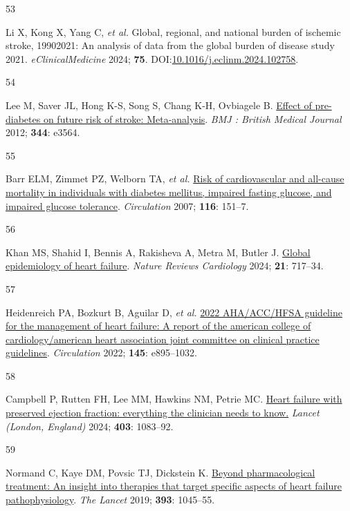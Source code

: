 \documentclass[
  a4paper,
  headsepline=true,
  open=left]{scrbook}
\newlength{\cslhangindent}
\newlength{\csllabelwidth}
\newlength{\cslentryspacingunit} %
\newenvironment{CSLReferences}[2] %
 {%
  \setlength{\parindent}{0pt}
  \ifodd #1
  \let\oldpar\par
  \def\par{\hangindent=\cslhangindent\oldpar}
  \fi
  \setlength{\parskip}{#2\cslentryspacingunit}
 }%
 {}
\newcommand{\CSLLeftMargin}[1]{\parbox[t]{\csllabelwidth}{#1}}
\newcommand{\CSLRightInline}[1]{\parbox[t]{\linewidth - \csllabelwidth}{#1}\break}
\begin{document}
\begin{CSLReferences}{0}{0}
\leavevmode{}%
\CSLLeftMargin{53 }%
\CSLRightInline{Li X, Kong X, Yang C, \emph{et al.} Global, regional,
and national burden of ischemic stroke, 1990{\textendash}2021: An
analysis of data from the global burden of disease study 2021.
\emph{eClinicalMedicine} 2024; \textbf{75}.
DOI:\href{https://doi.org/10.1016/j.eclinm.2024.102758}{10.1016/j.eclinm.2024.102758}.}

\leavevmode{}%
\CSLLeftMargin{54 }%
\CSLRightInline{Lee M, Saver JL, Hong K-S, Song S, Chang K-H, Ovbiagele
B. \href{https://doi.org/10.1136/bmj.e3564}{Effect of pre-diabetes on
future risk of stroke: Meta-analysis}. \emph{BMJ : British Medical
Journal} 2012; \textbf{344}: e3564.}

\leavevmode{}%
\CSLLeftMargin{55 }%
\CSLRightInline{Barr ELM, Zimmet PZ, Welborn TA, \emph{et al.}
\href{https://doi.org/10.1161/CIRCULATIONAHA.106.685628}{Risk of
cardiovascular and all-cause mortality in individuals with diabetes
mellitus, impaired fasting glucose, and impaired glucose tolerance}.
\emph{Circulation} 2007; \textbf{116}: 151--7.}

\leavevmode{}%
\CSLLeftMargin{56 }%
\CSLRightInline{Khan MS, Shahid I, Bennis A, Rakisheva A, Metra M,
Butler J. \href{https://doi.org/10.1038/s41569-024-01046-6}{Global
epidemiology of heart failure}. \emph{Nature Reviews Cardiology} 2024;
\textbf{21}: 717--34.}

\leavevmode{}%
\CSLLeftMargin{57 }%
\CSLRightInline{Heidenreich PA, Bozkurt B, Aguilar D, \emph{et al.}
\href{https://doi.org/10.1161/CIR.0000000000001063}{2022 AHA/ACC/HFSA
guideline for the management of heart failure: A report of the american
college of cardiology/american heart association joint committee on
clinical practice guidelines}. \emph{Circulation} 2022; \textbf{145}:
e895--1032.}

\leavevmode{}%
\CSLLeftMargin{58 }%
\CSLRightInline{Campbell P, Rutten FH, Lee MM, Hawkins NM, Petrie MC.
\href{https://doi.org/10.1016/S0140-6736(23)02756-3}{Heart failure with
preserved ejection fraction: everything the clinician needs to know.}
\emph{Lancet (London, England)} 2024; \textbf{403}: 1083--92.}

\leavevmode{}%
\CSLLeftMargin{59 }%
\CSLRightInline{Normand C, Kaye DM, Povsic TJ, Dickstein K.
\href{https://doi.org/10.1016/S0140-6736(18)32216-5}{Beyond
pharmacological treatment: An insight into therapies that target
specific aspects of heart failure pathophysiology}. \emph{The Lancet}
2019; \textbf{393}: 1045--55.}


\end{CSLReferences}
\end{document}

